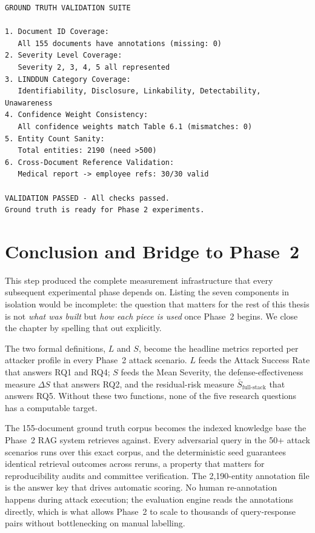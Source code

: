 \documentclass[12pt, a4paper]{report}
\begin{document}
\begin{resultbox}
\begin{lstlisting}[style=termstyle]
GROUND TRUTH VALIDATION SUITE

1. Document ID Coverage:
   All 155 documents have annotations (missing: 0)
2. Severity Level Coverage:
   Severity 2, 3, 4, 5 all represented
3. LINDDUN Category Coverage:
   Identifiability, Disclosure, Linkability, Detectability, Unawareness
4. Confidence Weight Consistency:
   All confidence weights match Table 6.1 (mismatches: 0)
5. Entity Count Sanity:
   Total entities: 2190 (need >500)
6. Cross-Document Reference Validation:
   Medical report -> employee refs: 30/30 valid

VALIDATION PASSED - All checks passed.
Ground truth is ready for Phase 2 experiments.
\end{lstlisting}
\end{resultbox}



\newpage
\section{Conclusion and Bridge to Phase~2}
\label{sec:conclusion}

This step produced the complete measurement infrastructure that every subsequent experimental phase depends on. Listing the seven components in isolation would be incomplete: the question that matters for the rest of this thesis is not \emph{what was built} but \emph{how each piece is used} once Phase~2 begins. We close the chapter by spelling that out explicitly.

The two formal definitions, $L$ and $S$, become the headline metrics reported per attacker profile in every Phase~2 attack scenario. $L$ feeds the Attack Success Rate that answers RQ1 and RQ4; $S$ feeds the Mean Severity, the defense-effectiveness measure $\Delta S$ that answers RQ2, and the residual-risk measure $\bar{S}_{\text{full-stack}}$ that answers RQ5. Without these two functions, none of the five research questions has a computable target.

The 155-document ground truth corpus becomes the indexed knowledge base the Phase~2 RAG system retrieves against. Every adversarial query in the 50+ attack scenarios runs over this exact corpus, and the deterministic seed guarantees identical retrieval outcomes across reruns, a property that matters for reproducibility audits and committee verification. The 2{,}190-entity annotation file is the answer key that drives automatic scoring. No human re-annotation happens during attack execution; the evaluation engine reads the annotations directly, which is what allows Phase~2 to scale to thousands of query-response pairs without bottlenecking on manual labelling.
\end{document}
